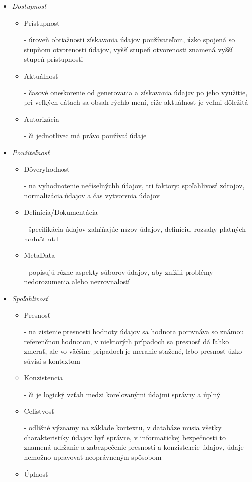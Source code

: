 \documentclass[10pt,slovak,a4paper]{article}
\begin{document}
\begin{itemize}
\item \emph {Dostupnosť}
	\begin{itemize}
	\item Prístupnosť

	 - úroveň obtiažnosti získavania údajov používateľom, úzko spojená so stupňom otvorenosti údajov, vyšší stupeň otvorenosti znamená vyšší stupeň prístupnosti
	\item Aktuálnosť

	 - časové oneskorenie od generovania a získavania údajov po jeho využitie, pri veľkých dátach sa obsah rýchlo mení, ciže aktuálnosť je veľmi dôležitá
	\item Autorizácia

	 - či jednotlivec má právo používať údaje
	\end{itemize}
\item \emph {Použiteľnosť}
	\begin{itemize}
	\item Dôveryhodnosť

	 - na vyhodnotenie nečíselnýchh údajov, tri faktory: spoľahlivosť zdrojov, normalizácia údajov a čas vytvorenia údajov
	\item Definícia/Dokumentácia

	- špecifikácia údajov zahŕňajúc názov údajov, definíciu, rozsahy platných hodnôt atď.
	\item MetaData

	- popisujú rôzne aspekty súborov údajov, aby znížili problémy nedorozumenia alebo nezrovnalostí
	\end{itemize}
\item \emph {Spoľahlivosť}
	\begin{itemize}
	\item Presnosť

	- na zistenie presnosti hodnoty údajov sa hodnota porovnáva so známou referenčnou hodnotou, v niektorých prípadoch sa presnosť dá ľahko zmerať, ale vo väčšine pripadoch je meranie sťažené, lebo presnosť úzko súvisí s kontextom
	\item Konzistencia

	- či je logický vzťah medzi korelovanými údajmi správny a úplný
	\item Celistvosť

	- odlišné významy na základe kontextu, v databáze musia všetky charakteristiky údajov byť správne, v informatickej bezpečnosti to znamená udržanie a zabezpečenie presnosti a konzistencie údajov, údaje 	nemožno upravovať neoprávneným spôsobom
	\item Úplnosť


\end{itemize}
\end{itemize}
\end{document}
